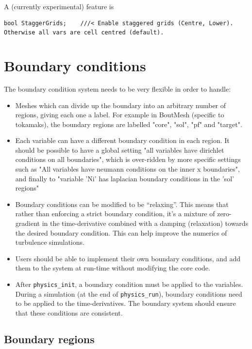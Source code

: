 \documentclass[12pt]{article}
\newcommand{\code}[1]{\texttt{#1}}
\begin{document}
A (currently experimental) feature is 
\begin{lstlisting}
bool StaggerGrids;    ///< Enable staggered grids (Centre, Lower). Otherwise all vars are cell centred (default).
\end{lstlisting}

\section{Boundary conditions}
\label{sec:boundaries}

The boundary condition system needs to be very flexible in order to handle:
\begin{itemize}
\item Meshes which can divide up the boundary into an arbitrary number
  of regions, giving each one a label. For example in BoutMesh 
  (specific to tokamaks), the boundary regions are labelled "core",
  "sol", "pf" and "target".
\item Each variable can have a different boundary condition in each region.
  It should be possible to have a global setting "all variables have dirichlet
  conditions on all boundaries", which is over-ridden by more specific settings
  such as "All variables have neumann conditions on the inner x boundaries", 
  and finally to "variable 'Ni' has laplacian boundary conditions in the
  'sol' regions"
\item Boundary conditions can be modified to be ``relaxing''. This means that
  rather than enforcing a strict boundary condition, it's a mixture of
  zero-gradient in the time-derivative combined with a damping (relaxation)
  towards the desired boundary condition. This can help improve the numerics
  of turbulence simulations.
\item Users should be able to implement their own boundary conditions,
  and add them to the system at run-time without modifying the core code.
\item After \code{physics\_init}, a boundary condition must be applied to
  the variables. During a simulation (at the end of \code{physics\_run}),
  boundary conditions need to be applied to the time-derivatives. The
  boundary system should ensure that these conditions are consistent.
\end{itemize}

\subsection{Boundary regions}
\label{sec:BoundaryRegion}
\end{document}
